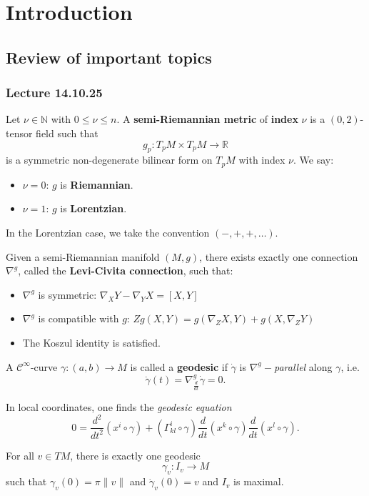 \chapter{Introduction}
\setcounter{section}{-1}
\section{Review of important topics}
\subsection{Lecture 14.10.25}
\begin{definition}
   Let $\nu \in \mathbb{N}$ with $0 \leq \nu \leq n$. A \textbf{semi-Riemannian metric} of \textbf{index} $\nu$ is a $(0,2)$-tensor field such that \[
   g_p: T_pM \times T_pM \to \mathbb{R}
   \] is a symmetric non-degenerate bilinear form on $T_pM$ with index $\nu$. We say:
   \begin{itemize}
       \item $\nu = 0$: $g$ is \textbf{Riemannian}.
        \item $\nu =1$: $g$ is \textbf{Lorentzian}.
   \end{itemize}
\end{definition}
In the Lorentzian case, we take the convention $(-,+,+,\dots)$.
\begin{theorem}
   Given a semi-Riemannian manifold $(M,g)$, there exists exactly one connection $\nabla^g$, called the \textbf{Levi-Civita connection}, such that:
   \begin{itemize}
       \item $\nabla^g$ is symmetric: $\nabla_X Y - \nabla_Y X = [X,Y]$
       \item $\nabla^g$ is compatible with $g$: $Zg(X,Y)= g(\nabla_Z X, Y) + g(X, \nabla_Z Y)$
        \item The Koszul identity is satisfied.
   \end{itemize}
\end{theorem}
\begin{definition}[Geodesic]
    A $\mathcal{C}^\infty$-curve $\gamma: (a,b) \to M$ is called a \textbf{geodesic} if $\dot{\gamma}$ is $\nabla^g-$\emph{parallel} along $\gamma$, i.e. \[
        \ddot{\gamma}(t)= \nabla^g_{\frac{d}{dt}} \dot{\gamma}=0
    .\]
\end{definition}
In local coordinates, one finds the \emph{geodesic equation}
\[
    0 = \frac{d^2}{dt^2} (x^i \circ \gamma) + (\Gamma_{kl}^i \circ \gamma) \frac{d}{dt}(x^k \circ \gamma) \frac{d}{dt} (x^l \circ \gamma)
.\] 
\begin{theorem}
    For all $v \in TM$, there is exactly one geodesic \[
    \gamma_v: I_v \to M
\] such that $\gamma_v(0)=\pi \|v\|$ and $\dot{\gamma}_v (0)=v$ and $I_v$ is maximal.
\end{theorem}
